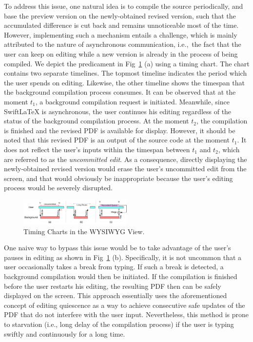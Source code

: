 \documentclass[sigconf]{acmart}
\newcommand{\ie}{i.e.,\ }
\begin{document}
To address this issue, one natural idea is to  compile the source periodically, and base the preview version on the newly-obtained revised version, such that the accumulated difference is cut back and remains unnoticeable most of the time. However, implementing such a mechanism entails a challenge, which is mainly attributed to the nature of asynchronous communication, \ie the fact that the user can keep on editing while a new version is already in the process of being compiled. 
We depict the predicament in Fig~\ref{fig:timingchart} (a) using a timing chart.
The chart contains two separate timelines. 
The topmost timeline indicates the period which the user spends on editing.
Likewise, the other timeline shows the timespan that the background compilation process consumes.
It can be observed that at the moment $t_1$, a background compilation request is initiated.
Meanwhile, since SwiftLaTeX is asynchronous, the user continues his editing regardless of the status of the background compilation process.
At the moment $t_2$, the compilation is finished and the revised PDF is available for display.
However, it should be noted that this revised PDF is an output of the source code at the moment $t_1$. 
It does not reflect the user's inputs within the timespan between $t_1$ and $t_2$, which are referred to as the \textit{uncommitted edit}.
As a consequence, directly displaying the newly-obtained revised version would erase the user's uncommitted edit  from the screen, and that would  obviously be inappropriate because the user's editing process would be severely disrupted.

\begin{figure}[t]
\begin{center}
\includegraphics[width=0.5\textwidth]{figure/timechart}
\caption{Timing Charts in the WYSIWYG View.}
\label{fig:timingchart}
\end{center}
\end{figure}

One naive way to bypass this issue would be to take advantage of the user's pauses in editing as shown in Fig~\ref{fig:timingchart} (b). 
Specifically, it is not uncommon that a user occasionally takes a break from typing.
If such a break is detected, a background compilation would then be initiated.
If the compilation is finished before the user restarts his editing, the resulting PDF then can be safely displayed on the screen. This approach essentially uses the aforementioned concept of editing quiescence as a way to achieve consecutive safe updates of the PDF that do not interfere with the user input.
Nevertheless, this method is prone to starvation (i.e., long delay of the compilation process) if the user is typing swiftly and continuously for a long time.
\end{document}
